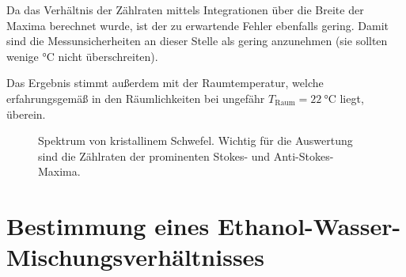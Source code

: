 \documentclass[../bericht.tex]{subfiles}
\begin{document}
    Da das Verhältnis der Zählraten mittels Integrationen über die Breite der Maxima berechnet wurde, ist der zu erwartende Fehler ebenfalls gering. Damit sind die Messunsicherheiten an dieser Stelle als gering anzunehmen (sie sollten wenige $\si{\celsius}$ nicht überschreiten).

    Das Ergebnis stimmt außerdem mit der Raumtemperatur, welche erfahrungsgemäß in den Räumlichkeiten bei ungefähr $T_\mathrm{Raum}=\SI{22}{\celsius}$ liegt, überein.

    \begin{figure}[htb]
      \centering
      \caption[Spektrum von kristallinem Schwefel.]{Spektrum von kristallinem Schwefel. Wichtig für die Auswertung sind die Zählraten der prominenten Stokes- und Anti-Stokes-Maxima.}
      \label{fig:schwefel}
    \end{figure}

  \section{Bestimmung eines Ethanol-Wasser-Mischungsverhältnisses}
  \label{sec:ethanol}
\end{document}
